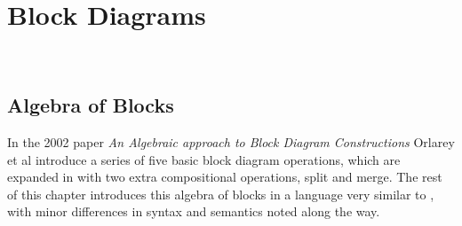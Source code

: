 \newcommand{\Block}[1]{\ensuremath{\textsc{#1}}\xspace}
\newcommand{\Ident}{\Block{ident}}
\newcommand{\Cut}{\Block{cut}}
\newcommand{\Sequential}{\Block{seq}}
\newcommand{\Parallel}{\Block{par}}
\newcommand{\Recursive}{\Block{rec}}
\newcommand{\Resample}{\Block{resample}}
\newcommand{\Split}{\Block{split}}
\newcommand{\Merge}{\Block{merge}}
\newcommand{\Mem}{\Block{mem}}
\newcommand{\Delay}{\Block{delay}}
\newcommand{\Ins}{\ensuremath{\textbf{ins}}\xspace}
\newcommand{\Outs}{\ensuremath{\textbf{outs}}\xspace}
\newcommand{\Sig}{\ensuremath{\mathbb{S}}\xspace}
\newcommand{\SigP}[1]{\ensuremath{\llbracket #1 \rrbracket}\xspace}


\chapter{Block Diagrams}
\label{chap:blocks}

\\

\section{Algebra of Blocks}

In the 2002 paper \emph{An Algebraic approach to Block Diagram Constructions}\autocite{orlarey2002} Orlarey et al introduce a series of five
basic block diagram operations, which are expanded in \autocite{orlarey2004} with two extra compositional
operations, split and merge. The rest of this chapter introduces this algebra of blocks in a language very
similar to \autocite{orlarey2004}, with minor differences in syntax and semantics noted along the way.

